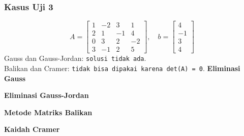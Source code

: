 \subsubsection{Kasus Uji 3}
\begin{kasus}
\[
A = \begin{bmatrix}
1 & -2 & 3 & 1 \\
2 & 1 & -1 & 4 \\
0 & 3 & 2 & -2 \\
3 & -1 & 2 & 5
\end{bmatrix}, \quad
b = \begin{bmatrix} 4 \\ -1 \\ 3 \\ 4 \end{bmatrix}
\]
Gauss dan Gauss-Jordan: \texttt{solusi tidak ada}.\\
Balikan dan Cramer: \texttt{tidak bisa dipakai karena det(A) = 0}.
\textbf{Eliminasi Gauss}

\textbf{Eliminasi Gauss-Jordan}

\textbf{Metode Matriks Balikan}

\textbf{Kaidah Cramer}
\end{kasus}


